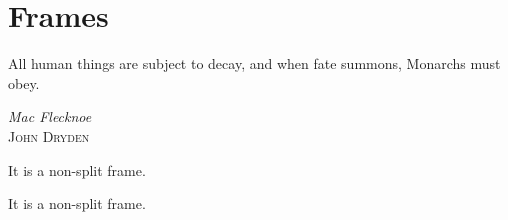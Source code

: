 
\chapter{Frames}
\label{ch:ch2}

\epigraph{All human things are subject to decay, and when fate summons, Monarchs must obey.}{\textit{Mac Flecknoe} \\ \textsc{John Dryden}}

\begin{notice}
	It is a non-split frame.
\end{notice}

\begin{notice}
	\lipsum[6-7]
\end{notice}

\lipsum[8-9]

\begin{highlight}[Problem 1]
	It is a non-split frame.
\end{highlight}

\lipsum[10-11]

\begin{highlight}[Problem 2]
	\lipsum[12-13]
\end{highlight}

\begin{highlight*}[No Problem]
	\lipsum[14-15]
\end{highlight*}
